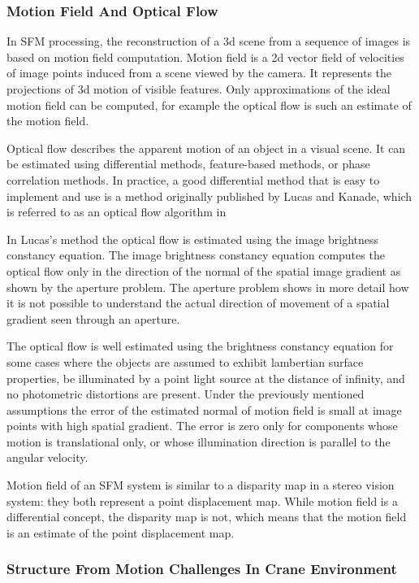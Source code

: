\documentclass[12pt,a4paper,oneside,pdftex]{report}
\begin{document}
{%
\subsubsection{Motion Field And Optical Flow}
\label{subsubsection:motion_field_and_optical_flow}

In SFM processing, the reconstruction of a 3d scene from a sequence of images is based on motion field computation. Motion field is a 2d vector field of velocities of image points induced from a scene viewed by the camera. It represents the projections of 3d motion of visible features. Only approximations of the ideal motion field can be computed, for example the optical flow is such an estimate of the motion field.

Optical flow describes the apparent motion of an object in a visual scene. It can be estimated using differential methods, feature-based methods, or phase correlation methods. In practice, a good differential method that is easy to implement and use is a method originally published by Lucas and Kanade, which is referred to as an optical flow algorithm in \citep{Trucco98, Lucas81}

In Lucas's method the optical flow is estimated using the image brightness constancy equation. The image brightness constancy equation computes the optical flow only in the direction of the normal of the spatial image gradient as shown by the aperture problem. The aperture problem shows in more detail how it is not possible to understand the actual direction of movement of a spatial gradient seen through an aperture.  

The optical flow is well estimated using the brightness constancy equation for some cases where the objects are assumed to exhibit lambertian surface properties, be illuminated by a point light source at the distance of infinity, and  no photometric distortions are present. Under the previously mentioned assumptions the error of the estimated normal of motion field is small at image points with high spatial gradient. The error is zero only for components whose motion is translational only, or whose illumination direction is parallel to the angular velocity. 

Motion field of an SFM system is similar to a disparity map in a stereo vision system: they both represent a point displacement map. While motion field is a differential concept, the disparity map is not, which means that the motion field is an estimate of the point displacement map.

\subsubsection{Structure From Motion Challenges In Crane Environment}
\label{subsubsection:structure_from_motion_challenges_in_crane_environment}

}
\end{document}

